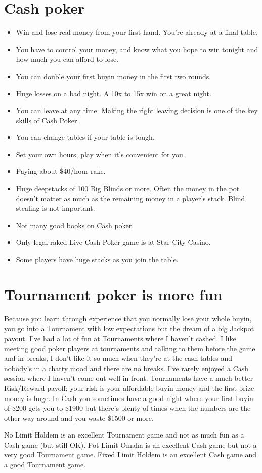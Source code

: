 \section{Cash poker}

\begin{itemize}
  \item Win and lose real money from your first hand. You're already
    at a final table.
  \item You have to control your money, and know what you hope to win
    tonight and how much you can afford to lose.
  \item You can double your first buyin money in the first two rounds.
  \item Huge losses on a bad night. A 10x to 15x win on a great night.
  \item You can leave at any time. Making the right leaving decision
    is one of the key skills of Cash Poker.
  \item You can change tables if your table is tough.
  \item Set your own hours, play when it's convenient for you.
  \item Paying about \$40/hour rake.
  \item Huge deepstacks of 100 Big Blinds or more. Often the money in
    the pot doesn't matter as much as the remaining money in a
    player's stack. Blind stealing is not important.
  \item Not many good books on Cash poker.
  \item Only legal raked Live Cash Poker game is at Star City Casino.
  \item Some players have huge stacks as you join the table.
\end{itemize}

\section{Tournament poker is more fun}

Because you learn through experience that you normally lose your whole
buyin, you go into a Tournament with low expectations but the dream of
a big Jackpot payout. I've had a lot of fun at Tournaments where I haven't
cashed. I like meeting good poker players at tournaments and talking
to them before the game and in breaks, I don't like it so much when
they're at the cash tables and nobody's in a chatty mood and there are
no breaks. I've rarely enjoyed a Cash session where I haven't come out
well in front. Tournaments have a much better Risk/Reward payoff; your
risk is your affordable buyin money and the first prize money is
huge. In Cash you sometimes have a good night where your first buyin
of \$200 gets you to \$1900 but there's plenty of times when the
numbers are the other way around and you waste \$1500 or more.

No Limit Holdem is an excellent Tournament game and not as much fun as
a Cash game (but still OK). Pot Limit Omaha is an excellent Cash game
but not a very good Tournament game. Fixed Limit Holdem is an
excellent Cash game and a good Tournament game.
